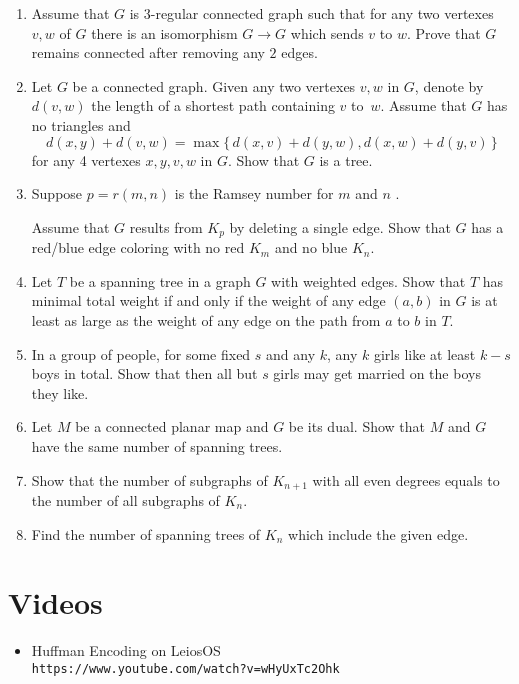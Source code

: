 \begin{enumerate}
\item Assume that $G$ is $3$-regular connected graph such that 
for any two vertexes $v,w$ of $G$ there is an isomorphism
$G\to G$ which sends $v$ to $w$.
Prove that $G$ remains connected after removing any $2$ edges.
\item  Let $G$ be a connected graph.
Given any two vertexes $v,w$ in $G$, denote by $d(v,w)$ the length of a shortest path containing $v$ to~$w$. 
Assume that $G$ has no triangles and
\[d(x,y)+d(v,w)=\max\{\,d(x,v)+d(y,w),d(x,w)+d(y,v)\,\}\]
for any 4 vertexes $x,y,v,w$ in $G$.
Show that $G$ is a tree.
\item Suppose $p=r(m,n)$ is the Ramsey number for $m$ and $n$%
.

Assume that $G$ results from $K_p$ by deleting a single edge.
Show that $G$ has a red/blue edge coloring with no red
$K_m$ and no blue $K_n$.
\item Let $T$ be a spanning tree in a graph $G$ with weighted edges.
Show that $T$ has minimal total weight if and only if the weight of any edge $(a,b)$ in $G$ is at least as large as the weight of any edge on the path from $a$ to $b$ in $T$.
\item In a group of people, for some fixed $s$ and any $k$,
any $k$ girls like at least $k-s$ boys in total.
Show that then all but $s$ girls may get married on the boys they like.
\item Let $M$ be a connected planar map and $G$ be its dual.
Show that $M$ and $G$ have the same number of spanning trees.
\item Show that the number of subgraphs of $K_{n+1}$ with all even degrees equals to the number of all subgraphs of $K_n$.

\item Find the number of spanning trees of $K_n$ which include the given edge.

\end{enumerate}

\chapter{Videos}

\begin{itemize}
 \item Huffman Encoding on LeiosOS\\ \texttt{https://www.youtube.com/watch?v=wHyUxTc2Ohk}
\end{itemize}
